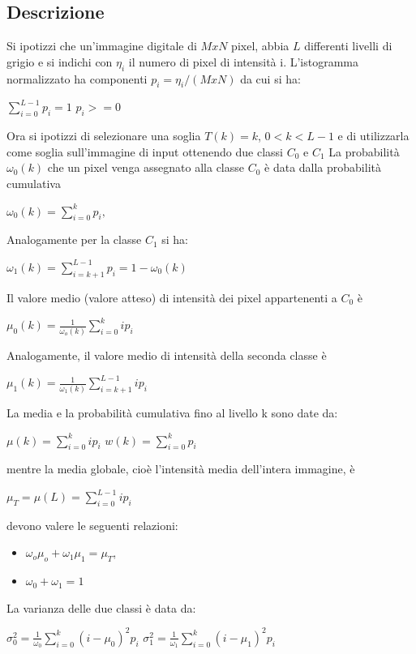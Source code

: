 \subsection{Descrizione}
Si ipotizzi che un'immagine digitale di $M x N$ pixel, abbia $L$ differenti livelli di grigio e si indichi con $\eta_i$
il numero di pixel di intensità i. L'istogramma normalizzato ha componenti $p_i = \eta_i/(M x N)$ da cui si ha:
\begin{center}
    $\sum_{i=0}^{L-1}p_i = 1$ $p_i >= 0$
\end{center}
Ora si ipotizzi di selezionare una soglia $T(k) = k$, $0 < k < L - 1$ e di utilizzarla come soglia sull'immagine di input ottenendo due classi $C_0$ e $C_1$
La probabilità $\omega_0(k)$ che un pixel venga assegnato alla classe $C_0$ è data dalla probabilità cumulativa
\begin{center}
    $\omega_0(k) = \sum_{i=0}^{k}p_i,$
\end{center}
Analogamente per la classe $C_1$ si ha:
\begin{center}
    $\omega_1(k) = \sum_{i=k+1}^{L-1}p_i=1-\omega_0(k)$
\end{center}
Il valore medio (valore atteso) di intensità dei pixel appartenenti a
$C_0$ è
\begin{center}
    $\mu_0(k)=\frac{1}{\omega_o(k)} \sum_{i=0}^{k}ip_i$
\end{center}
Analogamente, il valore medio di intensità della seconda classe è
\begin{center}
    $\mu_1(k)=\frac{1}{\omega_1(k)}\sum_{i=k+1}^{L-1}ip_i$
\end{center}
La media e la probabilità cumulativa fino al livello k sono date da:
\begin{center}
    $\mu(k)=\sum_{i=0}^{k}ip_i$ $w(k)=\sum_{i=0}^{k}p_i$
\end{center}
mentre la media globale, cioè l'intensità media dell'intera
immagine, è
\begin{center}
    $\mu_T=\mu(L)=\sum_{i=0}^{L-1}ip_i$
\end{center}
devono valere le seguenti relazioni:
\begin{itemize}
    \item $\omega_o \mu_o + \omega_1 \mu_1 = \mu_T$,
    \item $\omega_0 + \omega_1 = 1$
\end{itemize}
La varianza delle due classi è data da:
\begin{center}
    $\sigma^2_0 = \frac{1}{\omega_0}\sum_{i=0}^{k}(i-\mu_0)^2p_i$  $\sigma^2_1 = \frac{1}{\omega_1}\sum_{i=0}^{k}(i-\mu_1)^2p_i$
\end{center}
